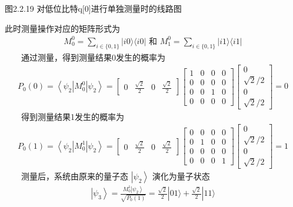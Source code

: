 \documentclass[a4paper,11pt,english]{sphinxmanual}
\begin{document}
\begin{center}图2.2.19 对低位比特q{[}0{]}进行单独测量时的线路图
\end{center}
\sphinxAtStartPar
此时测量操作对应的矩阵形式为
\begin{equation*}
\begin{split}M_{0}^{0}=\sum_{i \in\{0,1\}}|i 0\rangle\langle i 0| \text { 和 } M_{1}^{0}=\sum_{i \in\{0,1\}}|i 1\rangle\langle i 1|\end{split}
\end{equation*}
\sphinxAtStartPar
  通过测量，得到测量结果0发生的概率为
\begin{equation*}
\begin{split}P_{0}(0)=\left\langle\psi_{2}\left|M_{0}^{0}\right| \psi_{2}\right\rangle=\left[\begin{array}{llll} 0 & \frac{\sqrt{2}}{2} & 0 & \frac{\sqrt{2}}{2} \end{array}\right]\left[\begin{array}{cccc} 1 & 0 & 0 & 0 \\ 0 & 0 & 0 & 0 \\ 0 & 0 & 1 & 0 \\ 0 & 0 & 0 & 0 \end{array}\right]\left[\begin{array}{c} 0 \\ \sqrt{2} / 2 \\ 0 \\ \sqrt{2} / 2 \end{array}\right]=0\end{split}
\end{equation*}
\sphinxAtStartPar
  得到测量结果1发生的概率为
\begin{equation*}
\begin{split}P_{0}(1)=\left\langle\psi_{2}\left|M_{0}^{1}\right| \psi_{2}\right\rangle=\left[\begin{array}{llll} 0 & \frac{\sqrt{2}}{2} & 0 & \frac{\sqrt{2}}{2} \end{array}\right]\left[\begin{array}{cccc} 0 & 0 & 0 & 0 \\ 0 & 1 & 0 & 0 \\ 0 & 0 & 0 & 0 \\ 0 & 0 & 0 & 1 \end{array}\right]\left[\begin{array}{c} 0 \\ \sqrt{2} / 2 \\ 0 \\ \sqrt{2} / 2 \end{array}\right]=1\end{split}
\end{equation*}
\sphinxAtStartPar
  测量后，系统由原来的量子态 \(\left|\psi_{2}\right\rangle\) 演化为量子状态
\begin{equation*}
\begin{split}\left|\psi_{3}\right\rangle=\frac{M_{0}^{1}\left|\psi_{2}\right\rangle}{\sqrt{P_{0}(1)}}=\frac{\sqrt{2}}{2}|01\rangle+\frac{\sqrt{2}}{2}|11\rangle\end{split}
\end{equation*}
\end{document}
